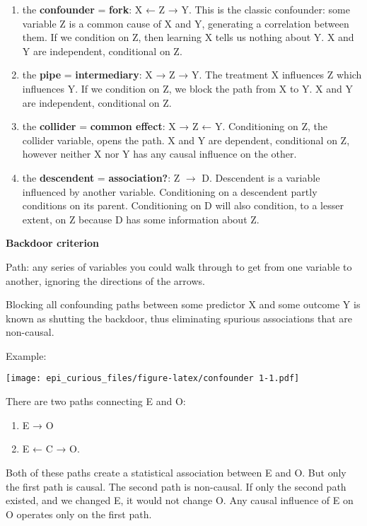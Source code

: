\documentclass[
]{article}
\begin{document}
\begin{enumerate}
\def\labelenumi{\arabic{enumi})}
\item
  the \textbf{confounder} = \textbf{fork}: X ← Z → Y. This is the
  classic confounder: some variable Z is a common cause of X and Y,
  generating a correlation between them. If we condition on Z, then
  learning X tells us nothing about Y. X and Y are independent,
  conditional on Z.
\item
  the \textbf{pipe} = \textbf{intermediary}: X → Z → Y. The treatment X
  influences Z which influences Y. If we condition on Z, we block the
  path from X to Y. X and Y are independent, conditional on Z.
\item
  the \textbf{collider} = \textbf{common effect}: X → Z ← Y.
  Conditioning on Z, the collider variable, opens the path. X and Y are
  dependent, conditional on Z, however neither X nor Y has any causal
  influence on the other.
\item
  the \textbf{descendent} = \textbf{association?}: Z \(\to\) D.
  Descendent is a variable influenced by another variable. Conditioning
  on a descendent partly conditions on its parent. Conditioning on D
  will also condition, to a lesser extent, on Z because D has some
  information about Z.
\end{enumerate}

\textbf{Backdoor criterion}

Path: any series of variables you could walk through to get from one
variable to another, ignoring the directions of the arrows.

Blocking all confounding paths between some predictor X and some outcome
Y is known as shutting the backdoor, thus eliminating spurious
associations that are non-causal.

Example:

\texttt{[image: epi\_curious\_files/figure-latex/confounder 1-1.pdf]}

There are two paths connecting E and O:

\begin{enumerate}
\def\labelenumi{(\arabic{enumi})}
\item
  E → O
\item
  E ← C → O.
\end{enumerate}

Both of these paths create a statistical association between E and O.
But only the first path is causal. The second path is non-causal. If
only the second path existed, and we changed E, it would not change O.
Any causal influence of E on O operates only on the first path.
\end{document}
